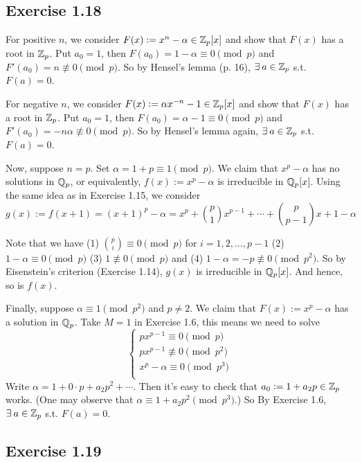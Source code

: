 \documentclass[../Koblitz.tex]{subfiles}
\begin{document}
\subsection*{Exercise 1.18}

For positive $n$, we consider $F(x):=x^n-\alpha\in\mathbb{Z}_p[x]$ and show that $F(x)$ has a root in $\mathbb{Z}_p$. Put $a_0=1$, then $F(a_0)=1-\alpha\equiv 0\pmod{p}$ and $F'(a_0)=n\not\equiv 0\pmod{p}$. So by Hensel's lemma (p. 16), $\exists a\in\ZZ_p$ s.t. $F(a)=0$.

For negative $n$, we consider $F(x):=\alpha x^{-n}-1\in\mathbb{Z}_p[x]$ and show that $F(x)$ has a root in $\mathbb{Z}_p$. Put $a_0=1$, then $F(a_0)=\alpha-1\equiv 0\pmod{p}$ and $F'(a_0)=-n\alpha\not\equiv 0\pmod{p}$. So by Hensel's lemma again, $\exists a\in\ZZ_p$ s.t. $F(a)=0$.

Now, suppose $n=p$. Set $\alpha=1+p\equiv1\pmod{p}$. We claim that $x^p-\alpha$ has no solutions in $\mathbb{Q}_p$, or equivalently, $f(x):=x^p-\alpha$ is irreducible in $\mathbb{Q}_p[x]$. Using the same idea as in Exercise 1.15, we consider $$g(x):=f(x+1)=(x+1)^p-\alpha = x^p+\binom{p}{1}x^{p-1}+\cdots+\binom{p}{p-1}x+1-\alpha$$

Note that we have (1) $\binom{p}{i}\equiv 0\pmod{p}$ for $i=1,2,\ldots,p-1$ (2) $1-\alpha\equiv 0\pmod{p}$ (3) $1\not\equiv 0\pmod{p}$ and (4) $1-\alpha=-p\not\equiv0\pmod{p^2}$. So by Eisenstein's criterion (Exercise 1.14), $g(x)$ is irreducible in $\mathbb{Q}_p[x]$. And hence, so is $f(x)$.

Finally, suppose $\alpha\equiv1\pmod{p^2}$ and $p\neq2$. We claim that $F(x):=x^p-\alpha$ has a solution in $\mathbb{Q}_p$. Take $M=1$ in Exercise 1.6, this means we need to solve
$$
\begin{cases*}
    px^{p-1} \equiv0\pmod{p} \\
    px^{p-1} \not\equiv0\pmod{p^2} \\
    x^p-\alpha \equiv0 \pmod{p^3} \\
\end{cases*}
$$
Write $\alpha=1+0\cdot p+a_2p^2+\cdots$. Then it's easy to check that $a_0:=1+a_2p\in\mathbb{Z}_p$ works. (One may observe that $\alpha\equiv 1+a_2p^2\pmod{p^3}$.) So By Exercise 1.6, $\exists a\in\ZZ_p$ s.t. $F(a)=0$.

\subsection*{Exercise 1.19}
\end{document}
